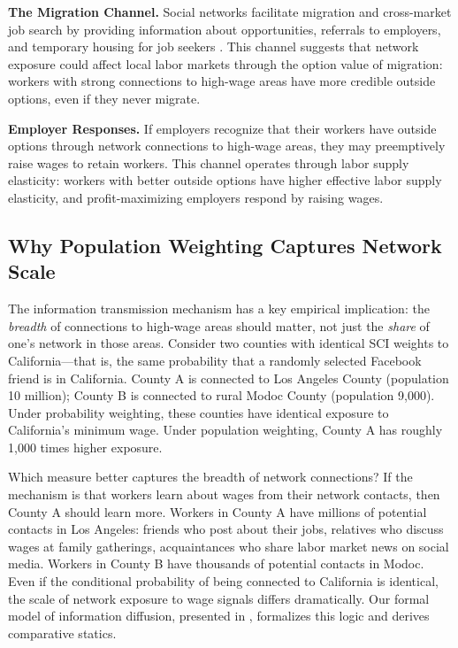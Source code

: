 \documentclass[12pt]{article}
\begin{document}
\textbf{The Migration Channel.} Social networks facilitate migration and cross-market job search by providing information about opportunities, referrals to employers, and temporary housing for job seekers \citep{munshi2003networks}. This channel suggests that network exposure could affect local labor markets through the option value of migration: workers with strong connections to high-wage areas have more credible outside options, even if they never migrate.

\textbf{Employer Responses.} If employers recognize that their workers have outside options through network connections to high-wage areas, they may preemptively raise wages to retain workers. This channel operates through labor supply elasticity: workers with better outside options have higher effective labor supply elasticity, and profit-maximizing employers respond by raising wages.

\subsection{Why Population Weighting Captures Network Scale}

The information transmission mechanism has a key empirical implication: the \textit{breadth} of connections to high-wage areas should matter, not just the \textit{share} of one's network in those areas. Consider two counties with identical SCI weights to California---that is, the same probability that a randomly selected Facebook friend is in California. County A is connected to Los Angeles County (population 10 million); County B is connected to rural Modoc County (population 9,000). Under probability weighting, these counties have identical exposure to California's minimum wage. Under population weighting, County A has roughly 1,000 times higher exposure.

Which measure better captures the breadth of network connections? If the mechanism is that workers learn about wages from their network contacts, then County A should learn more. Workers in County A have millions of potential contacts in Los Angeles: friends who post about their jobs, relatives who discuss wages at family gatherings, acquaintances who share labor market news on social media. Workers in County B have thousands of potential contacts in Modoc. Even if the conditional probability of being connected to California is identical, the scale of network exposure to wage signals differs dramatically. Our formal model of information diffusion, presented in , formalizes this logic and derives comparative statics.
\end{document}
